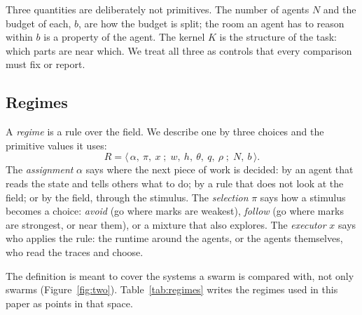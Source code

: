 \documentclass[10pt,twocolumn]{article}
\begin{document}
Three quantities are deliberately not primitives. The number of agents $N$ and the budget of each, $b$, are how the budget is split; the room an agent has to reason within $b$ is a property of the agent. The kernel $K$ is the structure of the task: which parts are near which. We treat all three as controls that every comparison must fix or report.

\subsection{Regimes}

A \emph{regime} is a rule over the field. We describe one by three choices and the primitive values it uses:
\[
R = \langle\, \alpha,\ \pi,\ x \;;\; w,\ h,\ \theta,\ q,\ \rho \;;\; N,\ b \,\rangle .
\]
The \emph{assignment} $\alpha$ says where the next piece of work is decided: by an agent that reads the state and tells others what to do; by a rule that does not look at the field; or by the field, through the stimulus. The \emph{selection} $\pi$ says how a stimulus becomes a choice: \emph{avoid} (go where marks are weakest), \emph{follow} (go where marks are strongest, or near them), or a mixture that also explores. The \emph{executor} $x$ says who applies the rule: the runtime around the agents, or the agents themselves, who read the traces and choose.

The definition is meant to cover the systems a swarm is compared with, not only swarms (Figure~\ref{fig:two}). Table~\ref{tab:regimes} writes the regimes used in this paper as points in that space.
\end{document}

